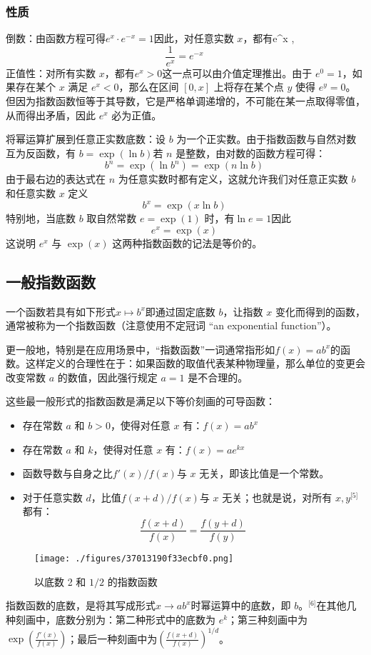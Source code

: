 \subsubsection{性质}
倒数：由函数方程可得$e^x \cdot e^{-x} = 1$因此，对任意实数 $x$，都有e^x ,$$\frac{1}{e^x} = e^{-x}~$$正值性：对所有实数 $x$，都有$e^x > 0$这一点可以由介值定理推出。由于 $e^0 = 1$，如果存在某个 $x$ 满足 $e^x < 0$，那么在区间 $[0, x]$ 上将存在某个点 $y$ 使得 $e^y = 0$。但因为指数函数恒等于其导数，它是严格单调递增的，不可能在某一点取得零值，从而得出矛盾，因此 $e^x$ 必为正值。

将幂运算扩展到任意正实数底数：设 $b$ 为一个正实数。由于指数函数与自然对数互为反函数，有
$b = \exp(\ln b)$若 $n$ 是整数，由对数的函数方程可得：
$$
b^n = \exp(\ln b^n) = \exp(n \ln b)~
$$
由于最右边的表达式在 $n$ 为任意实数时都有定义，这就允许我们对任意正实数 $b$ 和任意实数 $x$ 定义
$$
b^x = \exp(x \ln b)~
$$
特别地，当底数 $b$ 取自然常数 $e = \exp(1)$ 时，有$\ln e = 1$因此
$$
e^x = \exp(x)~
$$
这说明 $e^x$ 与 $\exp(x)$ 这两种指数函数的记法是等价的。
\subsection{一般指数函数}
一个函数若具有如下形式$x \mapsto b^x$即通过固定底数 $b$，让指数 $x$ 变化而得到的函数，通常被称为一个指数函数（注意使用不定冠词 “an exponential function”）。

更一般地，特别是在应用场景中，“指数函数”一词通常指形如$f(x) = a b^x$的函数。这样定义的合理性在于：如果函数的取值代表某种物理量，那么单位的变更会改变常数 $a$ 的数值，因此强行规定 $a = 1$ 是不合理的。

这些最一般形式的指数函数是满足以下等价刻画的可导函数：
\begin{itemize}
\item 存在常数 $a$ 和 $b > 0$，使得对任意 $x$ 有：$f(x) = a b^x$
\item 存在常数 $a$ 和 $k$，使得对任意 $x$ 有：$f(x) = a e^{k x}$
\item 函数导数与自身之比$f'(x)/f(x)$与 $x$ 无关，即该比值是一个常数。
\item 对于任意实数 $d$，比值$f(x + d)/f(x)$与 $x$ 无关；也就是说，对所有 $x, y^\text{[5]}$ 都有：
$$
\frac{f(x + d)}{f(x)} = \frac{f(y + d)}{f(y)}~
$$
\end{itemize}
\begin{figure}[ht]
\centering
\texttt{[image: ./figures/37013190f33ecbf0.png]}
\caption{以底数 2 和 $1/2$ 的指数函数} \label{fig_ZShs_3}
\end{figure}
指数函数的底数，是将其写成形式$x \to a b^x$时幂运算中的底数，即 $b$。\(^\text{[6]}\)在其他几种刻画中，底数分别为：第二种形式中的底数为 $e^k$；第三种刻画中为$\exp\left( \frac{f'(x)}{f(x)} \right) $；最后一种刻画中为$\left( \frac{f(x+d)}{f(x)} \right)^{1/d}$。
